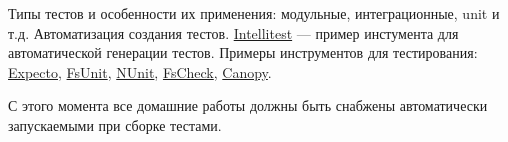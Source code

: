     Типы тестов и особенности их применения: модульные, интеграционные, unit и т.д. Автоматизация создания тестов. \href{https://docs.microsoft.com/en-us/visualstudio/test/intellitest-manual/?view=vs-2019}{Intellitest} --- пример инстумента для автоматической генерации тестов. Примеры инструментов для тестирования: \href{https://github.com/haf/expecto}{Expecto}, \href{http://fsprojects.github.io/FsUnit/index.html}{FsUnit}, \href{https://nunit.org/}{NUnit}, \href{https://fscheck.github.io/FsCheck/}{FsCheck}, \href{http://lefthandedgoat.github.io/canopy/}{Canopy}. 

    С этого момента все домашние работы должны быть снабжены автоматически запускаемыми при сборке тестами.
